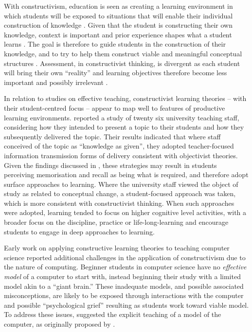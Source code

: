 With constructivism, education is seen as creating a learning environment in which students will be exposed to situations that will enable their individual construction of knowledge \cite{Jonassen:1991,Vrasidas:2000}. Given that the student is constructing their own knowledge, context is important and prior experience shapes what a student learns \cite{Jonassen:1991a}. The goal is therefore to guide students in the construction of their knowledge, and to try to help them construct viable and meaningful conceptual structures \cite{Jonassen:1991,Vrasidas:2000}. Assessment, in constructivist thinking, is divergent as each student will bring their own ``reality'' and learning objectives therefore become less important and possibly irrelevant \cite{Jonassen:1992}. 

In relation to studies on effective teaching, constructivist learning theories -- with their student-centred focus -- appear to map well to features of productive learning environments. \citet{Martin:2000} reported a study of twenty six university teaching staff, considering how they intended to present a topic to their students and how they subsequently delivered the topic. Their results indicated that where staff conceived of the topic as ``knowledge as given'', they adopted teacher-focused information transmission forms of delivery consistent with objectivist theories. Given the findings discussed in , these strategies may result in students perceiving memorisation and recall as being what is required, and therefore adopt surface approaches to learning. Where the university staff viewed the object of study as related to conceptual change, a student-focused approach was taken, which is more consistent with constructivist thinking. When such approaches were adopted, learning tended to focus on higher cognitive level activities, with a broader focus on the discipline, practice or life-long-learning and encourage students to engage in deep approaches to learning.


Early work on applying constructive learning theories to teaching computer science \cite{BenAri:1998,BenAri:2001} reported additional challenges in the application of constructivism due to the nature of computing. Beginner students in computer science have no \emph{effective model} of a computer to start with, instead beginning their study with a limited model akin to a ``giant brain.'' These inadequate models, and possible associated misconceptions, are likely to be exposed through interactions with the computer and possible ``psychological grief'' resulting as students work toward viable model. To address these issues, \citet{BenAri:1998,BenAri:2001} suggested the explicit teaching of a model of the computer, as originally proposed by \citet{DuBoulay:1986}. 

